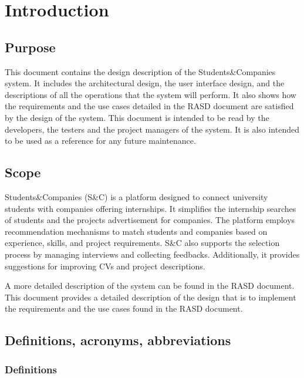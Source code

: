 \chapter{Introduction}

\section{Purpose}

This document contains the design description of the Students\&Companies system.
It includes the architectural design, the user interface design, and the descriptions of all the operations that the system will perform.
It also shows how the requirements and the use cases detailed in the RASD document are satisfied by the design of the system.
This document is intended to be read by the developers, the testers and the project managers of the system.
It is also intended to be used as a reference for any future maintenance.

\section{Scope}

Students\&Companies (S\&C) is a platform designed to connect university students with companies offering internships.
It simplifies the internship searches of students and the projects advertisement for companies.
The platform employs recommendation mechanisms to match students and companies based on experience, skills, and project requirements.
S\&C also supports the selection process by managing interviews and collecting feedbacks.
Additionally, it provides suggestions for improving CVs and project descriptions.

A more detailed description of the system can be found in the RASD document.
This document provides a detailed description of the design that is to implement the requirements and the use cases found in the RASD document.

\section{Definitions, acronyms, abbreviations}

\subsection{Definitions}

